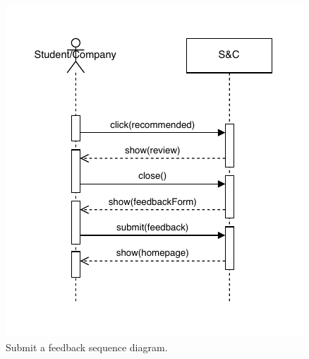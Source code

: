 \begin{figure}[H]
    \begin{center}
        \includegraphics[width=\linewidth]{Images/SequenceDiagram/SubmitFeedbackSD.pdf}
        \caption{Submit a feedback sequence diagram.}
        \label{fig:submit_a_feedback_seqdiag}%
    \end{center}
\end{figure}


